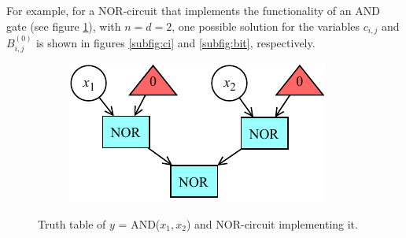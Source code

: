 \documentclass[letterpaper,10pt]{article}
\begin{document}
For example, for a NOR-circuit that implements the functionality of an AND gate (see figure \ref{fig:original}), with $n = d = 2$, one possible solution for the variables $c_{i,j}$ and $B_{i,j}^{(0)}$ is shown in figures \ref{subfig:ci} and \ref{subfig:bit}, respectively.
\begin{figure}[hbtp]
    \centering
    \begin{subfigure}[b]{0.45\textwidth}
    \end{subfigure}\hspace{-0.2\textwidth}
    \begin{subfigure}[b]{0.45\textwidth}
        \includegraphics[width=\textwidth]{circuit.pdf}
    \end{subfigure}
    \caption{Truth table of $y$ = AND($x_1,x_2$) and NOR-circuit implementing it.}
    \label{fig:original}
\end{figure}
\end{document}
